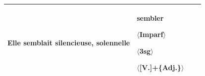 \begin{table}
\begin{center}
\begin{tabular}{|p{35mm}|p{28mm}|p{35mm}|p{28mm}|}
  \textbf{Elle semblait} silencieuse, solennelle &

  \textbf{sembler}\newline

  $\langle$Imparf$\rangle$\newline

  $\langle$3sg$\rangle$\newline

  $\langle$[V.]\;+\;\{Adj.\}$\rangle$\\

  \hline

  \end{tabular}

  \end{center}


\vspace*{8pt}

  \end{table}

  

